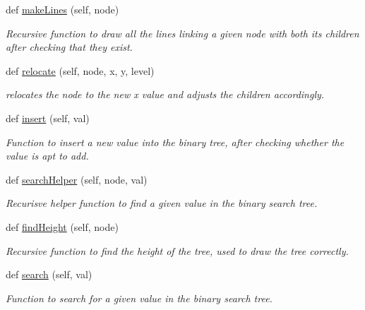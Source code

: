 \begin{DoxyCompactItemize}
def \hyperlink{class_binary_search_tree_1_1_binary_search_tree_a64a520f74e40f705873893befbe905c3}{make\+Lines} (self, node)
\begin{DoxyCompactList}\small\item\em Recursive function to draw all the lines linking a given node with both its children after checking that they exist. \end{DoxyCompactList}\item 
def \hyperlink{class_binary_search_tree_1_1_binary_search_tree_ae3acf8c976ea9f9dd05d381954c430ed}{relocate} (self, node, x, y, level)
\begin{DoxyCompactList}\small\item\em relocates the node to the new x value and adjusts the children accordingly. \end{DoxyCompactList}\item 
def \hyperlink{class_binary_search_tree_1_1_binary_search_tree_ab410c124ca03f9cb2f8b7f72a1529196}{insert} (self, val)
\begin{DoxyCompactList}\small\item\em Function to insert a new value into the binary tree, after checking whether the value is apt to add. \end{DoxyCompactList}\item 
def \hyperlink{class_binary_search_tree_1_1_binary_search_tree_ae170d61050f5e183ef93ed650d8449d7}{search\+Helper} (self, node, val)
\begin{DoxyCompactList}\small\item\em Recurisve helper function to find a given value in the binary search tree. \end{DoxyCompactList}\item 
def \hyperlink{class_binary_search_tree_1_1_binary_search_tree_ac04f7b8898dddd138c18e9e0bc7b68ad}{find\+Height} (self, node)
\begin{DoxyCompactList}\small\item\em Recursive function to find the height of the tree, used to draw the tree correctly. \end{DoxyCompactList}\item 
def \hyperlink{class_binary_search_tree_1_1_binary_search_tree_a250e673d04491e5d995b08b36e10072d}{search} (self, val)
\begin{DoxyCompactList}\small\item\em Function to search for a given value in the binary search tree. \end{DoxyCompactList}\item 

\end{DoxyCompactItemize}
